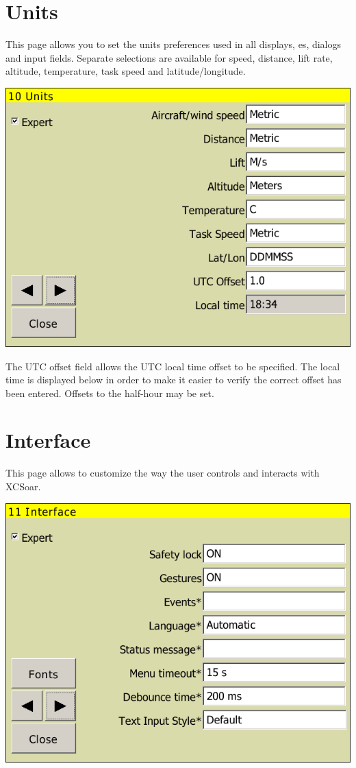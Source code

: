 \documentclass[a4paper,12pt]{refrep}
\begin{document}
\clearpage
\section{Units}

This page allows you to set the units preferences used in all
displays, {\InfoBox}es, dialogs and input fields.  Separate selections
are available for speed, distance, lift rate, altitude, temperature, task
speed and latitude/longitude.

\begin{center}
\includegraphics[angle=0,width=0.8\linewidth,keepaspectratio='true']{figures/config-units.png}
\end{center}

The UTC offset field allows the UTC local time offset to be specified.
The local time is displayed below in order to make it easier to verify
the correct offset has been entered.  Offsets to the half-hour may be
set.



\clearpage
\section{Interface}\label{sec:interface}

This page allows to customize the way the user controls and interacts with
XCSoar.

\begin{center}
\includegraphics[angle=0,width=0.8\linewidth,keepaspectratio='true']{figures/config-interface.png}
\end{center}
\end{document}

